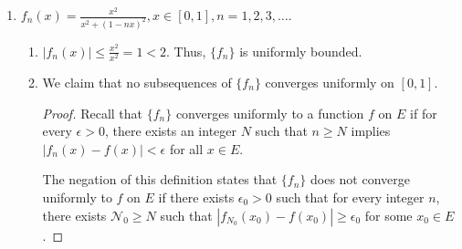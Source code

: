 \documentclass[letterpaper, reqno,11pt]{article}
\newcommand{\ZZ}{\mathbb{Z}}
\begin{document}
\begin{enumerate}
\begin{enumerate}
\begin{proof}
      On the other hand,
      \begin{equation*}
        \begin{split}
          & \quad \int_0^{2\pi} (\sin(n_k x) - \sin(n_{k + 1} x))^2 dx \\
          &= \int_0^{2\pi} \left(\sin^2(n_k x) + \sin^2(n_{k + 1} x) - 2 \sin(n_k x) \sin(n_{k + 1} x)\right) dx \\
          &= \int_0^{2\pi} \left(\frac{1 - \cos(2n_k x)}{2} + \frac{1 - \cos(2n_{k + 1} x)}{2} - (\cos((n_k - n_{k + 1}) x) - \cos((n_k + n_{k + 1}) x))\right) dx \\
          &= \int_0^{2\pi} 1 dx - \frac{1}{2} \int_0^{2\pi} \cos(2n_k x) dx - \frac{1}{2} \int_0^{2\pi} \cos(2n_{k + 1} x) dx \\
          & \qquad - \int_0^{2\pi} \cos((n_k - n_{k + 1}) x) dx - \int_0^{2\pi} \cos((n_k + n_{k + 1}) x) dx
        \end{split}
      \end{equation*}
      Note that $\int_0^{2\pi} \cos(mx) dx = \left.\frac{\sin(mx)}{m}\right|_0^{2\pi} = 0$ for $m \in \ZZ, m \neq 0$. Thus,
      $$ \int_0^{2\pi} (\sin(n_k x) - \sin(n_{k + 1} x))^2 dx = \int_0^{2\pi} dx = 2\pi. $$
      This implies that
      \begin{equation}\label{eq:2}
        \lim_{n \to \infty} \int_0^{2\pi} (\sin(n_k x) - \sin(n_{k + 1} x))^2 dx = 2\pi.
      \end{equation}
      \eqref{eq:1} contradicts \eqref{eq:2}.
    \end{proof}
  \end{enumerate}
\item $f_n(x) = \frac{x^2}{x^2 + (1 - nx)^2}, x \in [0, 1], n = 1, 2, 3, \ldots$.
  \begin{enumerate}
  \item $|f_n(x)| \leq \frac{x^2}{x^2} = 1 < 2$. Thus, $\{ f_n \}$ is uniformly bounded.
  \item We claim that no subsequences of $\{ f_n \}$ converges uniformly on $[0, 1]$.
    \begin{proof}
      Recall that $\{ f_n \}$ converges uniformly to a function $f$ on $E$ if for every $\epsilon > 0$, there exists an integer $N$ such that $n \geq N$ implies $|f_n(x) - f(x)| < \epsilon$ for all $x \in E$.

      The negation of this definition states that $\{ f_n \}$ does not converge uniformly to $f$ on $E$ if there exists $\epsilon_0 > 0$ such that for every integer $n$, there exists $\mathcal N_0 \geq N$ such that $|f_{N_0}(x_0)  - f(x_0)| \geq \epsilon_0$ for some $x_0 \in E$.


\end{proof}
\end{enumerate}
\end{enumerate}
\end{document}
